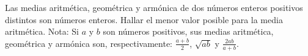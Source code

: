 Las medias aritmética, geométrica y armónica de dos números enteros positivos distintos son números enteros. Hallar el menor valor posible para la media aritmética. \newline 
Nota: Si $a$ y $b$ son números positivos, sus medias aritmética, geométrica y armónica son, respectivamente: $\frac{a+b}{2}$, $\sqrt{ab}$ y $\frac{2ab}{a+b}$.
